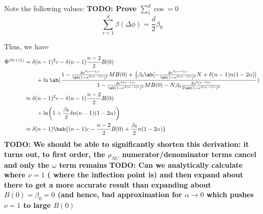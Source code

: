 Note the following values:
\textbf{TODO: Prove $\sum_1^d \cos = 0$}
\begin{equation}
  \sum_{r=1}^d \beta(\Delta \phi) = \frac{d}{2} \beta_0
\end{equation}

Thus, we have
\begin{equation}
  \begin{aligned}
    \Phi^{(0)+(1)} &=
\delta(n-1)^2 c - \delta (n-1) \frac{n-2}{2} B(0) \\
  &\qquad +
\ln\ab(
\frac{
1 -
    \frac{\delta e^{\delta(n-1)c}}{\ab(1-e^{\delta (n-1)c})^3}
  M B(0)
+
\frac{1}{2}\beta_0\ab[
-
    \frac{\delta e^{\delta(n-1)c}}{\ab(1-e^{\delta (n-1)c})^3} N
    +
\delta (n-1) n (1 - 2 \alpha)
]
}
{1 -
    \frac{\delta e^{\delta(n-1)c}}{\ab(1-e^{\delta (n-1)c})^3}
  M B(0)
  - N \beta_0 \frac{\delta e^{\delta(n-1)c}}{2\ab(1-e^{\delta (n-1)c})^3}
                  }
  )
  \\
  &\approx
\delta(n-1)^2 c - \delta (n-1) \frac{n-2}{2} B(0) \\
  &\qquad +
\ln \biggl(
  1 + \frac{\beta_0}{2} \delta n (n-1) (1-2\alpha)
\biggr)
  \\
  &\approx
  \delta(n-1) \bab{(n-1) c - \frac{n-2}{2} B(0) +
  \frac{\beta_0}{2} n (1-2\alpha)}
\end{aligned}
\label{eq:analytic_first_term}
\end{equation}
\textbf{TODO: We should be able to significantly shorten this
  derivation: it turns out, to first order, the $\rho_{NC}$
  numerator/denominator terms cancel and only the $\omega$ term remains}
\textbf{TODO: Can we analytically calculate where $\nu = 1$ (\ie{} where
  the inflection point is) and then expand about there to get a more
  accurate result than expanding about $B(0) = \beta_0 = 0$ (and hence,
  bad approximation for $\alpha \to 0$ which pushes $\nu=1$ to large
  $B(0)$}
